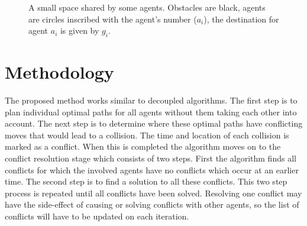 \documentclass[a4paper]{article}
\begin{document}
%

\begin{figure}[h]
	\centering
	\def\svgscale{.7}
	
	\caption{A small space shared by some agents. Obstacles are black, agents
	are circles inscribed with the agent's number ($a_i$), the destination for
	agent $a_i$ is given by $g_i$.}
	\label{fig:world}
\end{figure}

\section{Methodology}
The proposed method works similar to decoupled algorithms. The first step is to
plan individual optimal paths for all agents without them taking each other
into account. The next step is to determine where these optimal paths have
conflicting moves that would lead to a collision. The time and location of each
collision is marked as a conflict. When this is completed the algorithm moves
on to the conflict resolution stage which consists of two steps. First the
algorithm finds all conflicts for which the involved agents have no conflicts
which occur at an earlier time. The second step is to find a solution to all
these conflicts. This two step process is repeated until all conflicts have
been solved. Resolving one conflict may have the side-effect of causing or solving conflicts with other agents, so the list of conflicts will have to be updated on each iteration.
\end{document}
